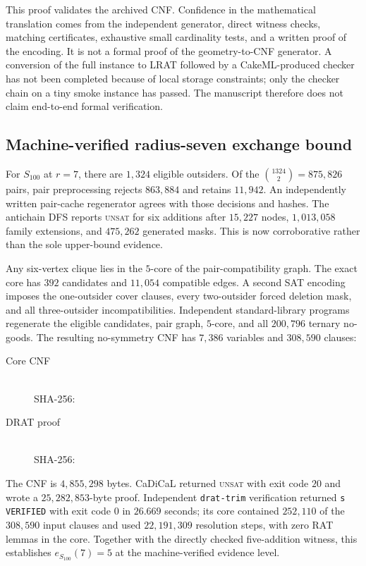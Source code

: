 \documentclass[11pt]{article}
\theoremstyle{definition}
\theoremstyle{remark}
\begin{document}
This proof validates the archived CNF.  Confidence in the mathematical
translation comes from the independent generator, direct witness checks,
matching certificates, exhaustive small cardinality tests, and a written proof
of the encoding.  It is not a formal proof of the geometry-to-CNF generator.
A conversion of the full instance to LRAT followed by a CakeML-produced checker
has not been completed because of local storage constraints; only the checker
chain on a tiny smoke instance has passed.  The manuscript therefore does not
claim end-to-end formal verification.

\subsection{Machine-verified radius-seven exchange bound}

For $S_{100}$ at $r=7$, there are $1{,}324$ eligible outsiders.  Of the
$\binom{1324}{2}=875{,}826$ pairs, pair preprocessing rejects $863{,}884$ and
retains $11{,}942$.  An independently written pair-cache regenerator agrees
with those decisions and hashes.  The antichain DFS reports \textsc{unsat} for
six additions after $15{,}227$ nodes, $1{,}013{,}058$ family extensions, and
$475{,}262$ generated masks.  This is now corroborative rather than the sole
upper-bound evidence.

Any six-vertex clique lies in the $5$-core of the pair-compatibility graph.
The exact core has $392$ candidates and $11{,}054$ compatible edges.  A second
SAT encoding imposes the one-outsider cover clauses, every two-outsider forced
deletion mask, and all three-outsider incompatibilities.  Independent
standard-library programs regenerate the eligible candidates, pair graph,
$5$-core, and all $200{,}796$ ternary no-goods.  The resulting no-symmetry CNF
has $7{,}386$ variables and $308{,}590$ clauses:
\begin{description}
\item[Core CNF]
\\
SHA-256:
\item[DRAT proof]
\\
SHA-256:
\end{description}
The CNF is $4{,}855{,}298$ bytes.  CaDiCaL returned \textsc{unsat} with exit
code $20$ and wrote a $25{,}282{,}853$-byte proof.  Independent
\texttt{drat-trim} verification returned \texttt{s VERIFIED} with exit code
$0$ in $26.669$ seconds; its core contained $252{,}110$ of the $308{,}590$
input clauses and used $22{,}191{,}309$ resolution steps, with zero RAT lemmas
in the core.  Together with the directly checked five-addition witness, this
establishes $e_{S_{100}}(7)=5$ at the machine-verified evidence level.
\end{document}
